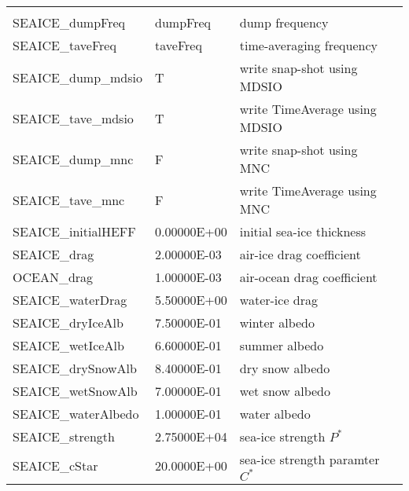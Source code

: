 \begin{table}[!ht]
{\begin{tabular}{|llp{5cm}c|}
    &  %
    \\
    SEAICE\_dumpFreq     &                   dumpFreq
    &   dump frequency
    &  %
    \\
   SEAICE\_taveFreq     &                   taveFreq
    &   time-averaging frequency 
    &  %
    \\
   SEAICE\_dump\_mdsio   &                     T
    &   write snap-shot   using MDSIO 
    &  %
    \\
   SEAICE\_tave\_mdsio   &                     T
    &   write TimeAverage using MDSIO 
    &  %
    \\
   SEAICE\_dump\_mnc     &                     F
    &   write snap-shot   using MNC 
    &  %
    \\
   SEAICE\_tave\_mnc     &                     F
    &   write TimeAverage using MNC 
    &  %
    \\
   SEAICE\_initialHEFF  &                   0.00000E+00
    &   initial sea-ice thickness 
    &  %
    \\
   SEAICE\_drag         &                   2.00000E-03
    &   air-ice drag coefficient 
    &  %
    \\
   OCEAN\_drag          &                   1.00000E-03
    &   air-ocean drag coefficient 
    &  %
    \\
   SEAICE\_waterDrag    &                   5.50000E+00
    &   water-ice drag 
    &  %
    \\
   SEAICE\_dryIceAlb    &                   7.50000E-01
    &   winter albedo 
    &  %
    \\
   SEAICE\_wetIceAlb    &                   6.60000E-01
    &   summer albedo 
    &  %
    \\
   SEAICE\_drySnowAlb   &                   8.40000E-01
    &   dry snow albedo 
    &  %
    \\
   SEAICE\_wetSnowAlb   &                   7.00000E-01
    &   wet snow albedo 
    &  %
    \\
   SEAICE\_waterAlbedo  &                   1.00000E-01
    &   water albedo 
    &  %
    \\
   SEAICE\_strength     &                   2.75000E+04
    &   sea-ice strength $P^{*}$
    &  %
    \\
   SEAICE\_cStar       &                    20.0000E+00
    &   sea-ice strength paramter $C^{*}$ 
    &  %
    \\

\end{tabular}}
\end{table}

